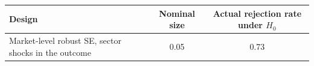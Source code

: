\begin{tabular}{lcc}\toprule
Design & Nominal size & Actual rejection rate under $H_0$ \\ \midrule
Market-level robust SE, sector shocks in the outcome & 0.05 & 0.73 \\
\bottomrule\end{tabular}
